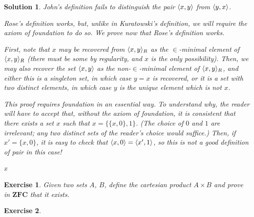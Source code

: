 \documentclass{article}
\newtheorem{ex}{Exercise}
\theoremstyle{nonumberplain}
\newtheorem{sol}{Solution}
\DeclarePairedDelimiter{\braket}{\langle}{\rangle}
\newcommand{\ZFC}{\mathbf{ZFC}}
\begin{document}
\begin{sol}
John's definition fails to distinguish the pair $\braket{x,y}$ from $\braket{y,x}$.

\smallskip

Rose's definition works, but, unlike in Kuratowski's definition, we will require the axiom of foundation to do so. We prove now that Rose's definition works.

First, note that $x$ may be recovered from $\braket{x,y}_R$ as the $\in$-minimal element of $\braket{x,y}_R$ (there must be some by regularity, and $x$ is the only possibility). Then, we may also recover the set $\braket{x,y}$ as the non-$\in$-minimal element of $\braket{x,y}_R$, and either this is a singleton set, in which case $y = x$ is recovered, or it is a set with two distinct elements, in which case $y$ is the unique element which is not $x$.

This proof requires foundation in an essential way. To understand why, the reader will have to accept that, without the axiom of foundation, it is consistent that there exists a set $x$ such that $x = \{\{x,0\}, 1\}$. (The choice of $0$ and $1$ are irrelevant; any two distinct sets of the reader's choice would suffice.) Then, if $x' = \{x,0\}$, it is easy to check that $\braket{x, 0} = \braket{x', 1}$, so this is not a good definition of pair in this case!

\smallskip

x
\end{sol}

\begin{ex}
Given two sets $A$, $B$, define the cartesian product $A \times B$ and prove in $\ZFC$ that it exists.
\end{ex}

\begin{ex}

\end{ex}
\end{document}
